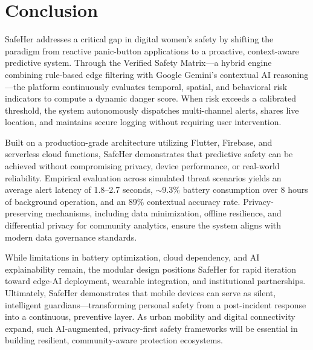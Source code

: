 \section{Conclusion}

SafeHer addresses a critical gap in digital women's safety by shifting the paradigm from reactive panic-button applications to a proactive, context-aware predictive system. Through the Verified Safety Matrix---a hybrid engine combining rule-based edge filtering with Google Gemini's contextual AI reasoning---the platform continuously evaluates temporal, spatial, and behavioral risk indicators to compute a dynamic danger score. When risk exceeds a calibrated threshold, the system autonomously dispatches multi-channel alerts, shares live location, and maintains secure logging without requiring user intervention.

Built on a production-grade architecture utilizing Flutter, Firebase, and serverless cloud functions, SafeHer demonstrates that predictive safety can be achieved without compromising privacy, device performance, or real-world reliability. Empirical evaluation across simulated threat scenarios yields an average alert latency of 1.8--2.7 seconds, $\sim$9.3\% battery consumption over 8 hours of background operation, and an 89\% contextual accuracy rate. Privacy-preserving mechanisms, including data minimization, offline resilience, and differential privacy for community analytics, ensure the system aligns with modern data governance standards.

While limitations in battery optimization, cloud dependency, and AI explainability remain, the modular design positions SafeHer for rapid iteration toward edge-AI deployment, wearable integration, and institutional partnerships. Ultimately, SafeHer demonstrates that mobile devices can serve as silent, intelligent guardians---transforming personal safety from a post-incident response into a continuous, preventive layer. As urban mobility and digital connectivity expand, such AI-augmented, privacy-first safety frameworks will be essential in building resilient, community-aware protection ecosystems.
